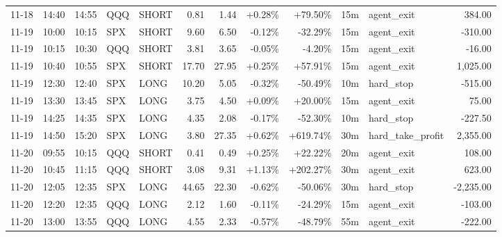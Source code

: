 \documentclass[11pt,a4paper]{article}
\begin{document}
\begin{center}
\begin{longtable}{>{\color{txtmain}}l l l l l r r r r r >{\color{txtmain}}l r}
11-18 & 14:40 & 14:55 & QQQ & SHORT & 0.81 & 1.44 & \textcolor{wingreen}{+0.28\%} & \textcolor{wingreen}{+79.50\%} & 15m & agent\_exit & \textcolor{wingreen}{384.00} \\
11-19 & 10:00 & 10:15 & SPX & SHORT & 9.60 & 6.50 & \textcolor{lossred}{-0.12\%} & \textcolor{lossred}{-32.29\%} & 15m & agent\_exit & \textcolor{lossred}{-310.00} \\
11-19 & 10:15 & 10:30 & QQQ & SHORT & 3.81 & 3.65 & \textcolor{lossred}{-0.05\%} & \textcolor{lossred}{-4.20\%} & 15m & agent\_exit & \textcolor{lossred}{-16.00} \\
11-19 & 10:40 & 10:55 & SPX & SHORT & 17.70 & 27.95 & \textcolor{wingreen}{+0.25\%} & \textcolor{wingreen}{+57.91\%} & 15m & agent\_exit & \textcolor{wingreen}{1,025.00} \\
11-19 & 12:30 & 12:40 & SPX & LONG & 10.20 & 5.05 & \textcolor{lossred}{-0.32\%} & \textcolor{lossred}{-50.49\%} & 10m & hard\_stop & \textcolor{lossred}{-515.00} \\
11-19 & 13:30 & 13:45 & SPX & LONG & 3.75 & 4.50 & \textcolor{wingreen}{+0.09\%} & \textcolor{wingreen}{+20.00\%} & 15m & agent\_exit & \textcolor{wingreen}{75.00} \\
11-19 & 14:25 & 14:35 & SPX & LONG & 4.35 & 2.08 & \textcolor{lossred}{-0.17\%} & \textcolor{lossred}{-52.30\%} & 10m & hard\_stop & \textcolor{lossred}{-227.50} \\
11-19 & 14:50 & 15:20 & SPX & LONG & 3.80 & 27.35 & \textcolor{wingreen}{+0.62\%} & \textcolor{wingreen}{+619.74\%} & 30m & hard\_take\_profit & \textcolor{wingreen}{2,355.00} \\
11-20 & 09:55 & 10:15 & QQQ & SHORT & 0.41 & 0.49 & \textcolor{wingreen}{+0.25\%} & \textcolor{wingreen}{+22.22\%} & 20m & agent\_exit & \textcolor{wingreen}{108.00} \\
11-20 & 10:45 & 11:15 & QQQ & SHORT & 3.08 & 9.31 & \textcolor{wingreen}{+1.13\%} & \textcolor{wingreen}{+202.27\%} & 30m & agent\_exit & \textcolor{wingreen}{623.00} \\
11-20 & 12:05 & 12:35 & SPX & LONG & 44.65 & 22.30 & \textcolor{lossred}{-0.62\%} & \textcolor{lossred}{-50.06\%} & 30m & hard\_stop & \textcolor{lossred}{-2,235.00} \\
11-20 & 12:20 & 12:35 & QQQ & LONG & 2.12 & 1.60 & \textcolor{lossred}{-0.11\%} & \textcolor{lossred}{-24.29\%} & 15m & agent\_exit & \textcolor{lossred}{-103.00} \\
11-20 & 13:00 & 13:55 & QQQ & LONG & 4.55 & 2.33 & \textcolor{lossred}{-0.57\%} & \textcolor{lossred}{-48.79\%} & 55m & agent\_exit & \textcolor{lossred}{-222.00} \\

\end{longtable}
\end{center}
\end{document}
